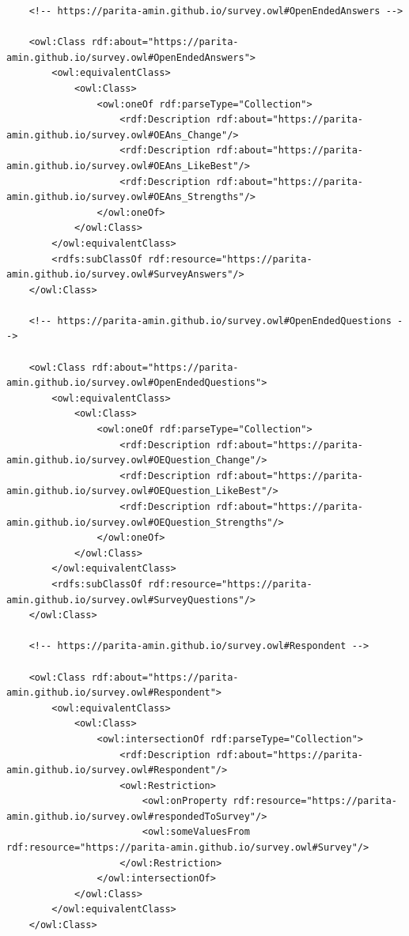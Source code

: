 \begin{lstlisting}
    <!-- https://parita-amin.github.io/survey.owl#OpenEndedAnswers -->

    <owl:Class rdf:about="https://parita-amin.github.io/survey.owl#OpenEndedAnswers">
        <owl:equivalentClass>
            <owl:Class>
                <owl:oneOf rdf:parseType="Collection">
                    <rdf:Description rdf:about="https://parita-amin.github.io/survey.owl#OEAns_Change"/>
                    <rdf:Description rdf:about="https://parita-amin.github.io/survey.owl#OEAns_LikeBest"/>
                    <rdf:Description rdf:about="https://parita-amin.github.io/survey.owl#OEAns_Strengths"/>
                </owl:oneOf>
            </owl:Class>
        </owl:equivalentClass>
        <rdfs:subClassOf rdf:resource="https://parita-amin.github.io/survey.owl#SurveyAnswers"/>
    </owl:Class>
    
    <!-- https://parita-amin.github.io/survey.owl#OpenEndedQuestions -->

    <owl:Class rdf:about="https://parita-amin.github.io/survey.owl#OpenEndedQuestions">
        <owl:equivalentClass>
            <owl:Class>
                <owl:oneOf rdf:parseType="Collection">
                    <rdf:Description rdf:about="https://parita-amin.github.io/survey.owl#OEQuestion_Change"/>
                    <rdf:Description rdf:about="https://parita-amin.github.io/survey.owl#OEQuestion_LikeBest"/>
                    <rdf:Description rdf:about="https://parita-amin.github.io/survey.owl#OEQuestion_Strengths"/>
                </owl:oneOf>
            </owl:Class>
        </owl:equivalentClass>
        <rdfs:subClassOf rdf:resource="https://parita-amin.github.io/survey.owl#SurveyQuestions"/>
    </owl:Class>
    
    <!-- https://parita-amin.github.io/survey.owl#Respondent -->

    <owl:Class rdf:about="https://parita-amin.github.io/survey.owl#Respondent">
        <owl:equivalentClass>
            <owl:Class>
                <owl:intersectionOf rdf:parseType="Collection">
                    <rdf:Description rdf:about="https://parita-amin.github.io/survey.owl#Respondent"/>
                    <owl:Restriction>
                        <owl:onProperty rdf:resource="https://parita-amin.github.io/survey.owl#respondedToSurvey"/>
                        <owl:someValuesFrom rdf:resource="https://parita-amin.github.io/survey.owl#Survey"/>
                    </owl:Restriction>
                </owl:intersectionOf>
            </owl:Class>
        </owl:equivalentClass>
    </owl:Class>
    

\end{lstlisting}

